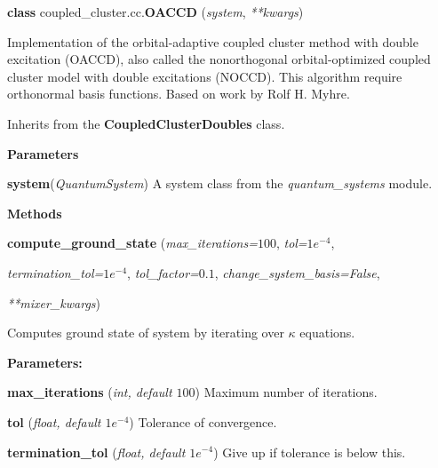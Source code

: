 \begin{tcolorbox}
    {\selectfont
    \textbf{class} coupled\_cluster.cc.\textbf{OACCD}
    (\emph{system}, \emph{**kwargs})

    \vspace{1em}
    Implementation of the orbital-adaptive coupled cluster method with double excitation
    (OACCD),
    also called the nonorthogonal orbital-optimized coupled cluster model with double 
    excitations (NOCCD).
    This algorithm require orthonormal basis functions. Based on work by Rolf H. 
    Myhre\cite{myhre2018demonstrating}.

    Inherits from the \textbf{CoupledClusterDoubles} class.

    \vspace{1em}
    \textbf{Parameters}

    \hspace{2em}\textbf{system}(\emph{QuantumSystem}) A system class from the 
        \emph{quantum\_systems} module.

    \vspace{1em} 
    \textbf{Methods}

    \hspace{2em} \textbf{compute\_ground\_state}
        (\emph{max\_iterations=$100$}, \emph{tol=$1e^{-4}$},

        \hspace{3em} \emph{termination\_tol=$1e^{-4}$}, \emph{tol\_factor=$0.1$},
        \emph{change\_system\_basis=False},
        
        \hspace{3.2em}\emph{**mixer\_kwargs})

        \begin{adjustwidth}{4em}{}
        Computes ground state of system by iterating over $\kappa$ equations.

        \textbf{Parameters:} 

            \hspace{1.5em}\textbf{max\_iterations} (\emph{int, default $100$}) 
            Maximum number of iterations.

            \hspace{1.5em}\textbf{tol} (\emph{float, default $1e^{-4}$})
            Tolerance of convergence.

            \hspace{1.5em}\textbf{termination\_tol} (\emph{float, default $1e^{-4}$})
            Give up if tolerance is below this.


\end{adjustwidth}}
\end{tcolorbox}
